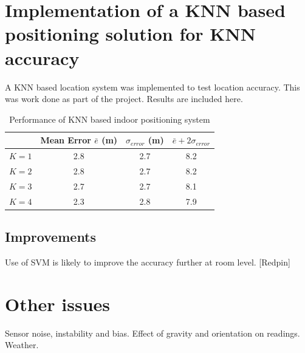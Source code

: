 \section{Implementation of a KNN based positioning solution for KNN accuracy\label{sec:knn_pos}}

A KNN based location system was implemented to test location accuracy. 
This was work done as part of the project. Results are included here.

\begin{table}[h]
    \centering
    \caption{Performance of KNN based indoor positioning system \label{tab:knnperf}}
    \begin{tabular}{|l|c|c|c|}
    \hline
              & Mean Error $\bar{e}$ (m) & $\sigma_{error}$ (m) & $\bar{e} + 2 \sigma_{error}$ \\
    \hline
    \hline
    $K = 1$    & 2.8 & 2.7 & 8.2 \\
    $K = 2$    & 2.8 & 2.7 & 8.2 \\
    $K = 3$    & 2.7 & 2.7 & 8.1 \\
    $K = 4$    & 2.3 & 2.8 & 7.9 \\
    \hline
    \end{tabular}

\end{table}


\subsection{Improvements}
Use of SVM is likely to improve the accuracy further at room level. [Redpin]


\section{Other issues}
Sensor noise, instability and bias. Effect of gravity and orientation on readings. Weather.

